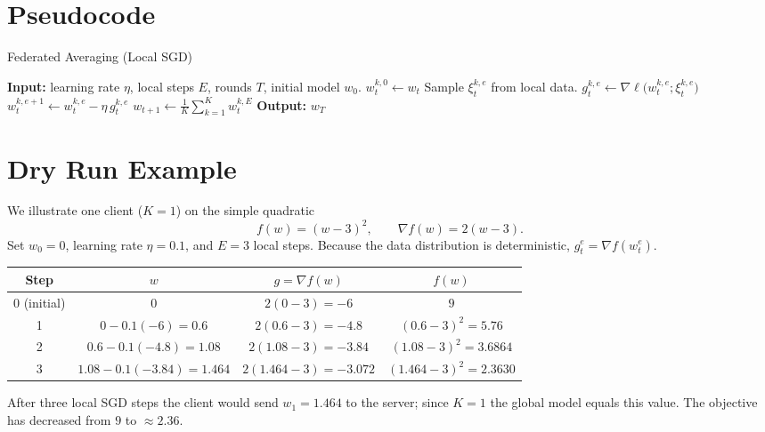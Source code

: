 \documentclass{article}
\newcommand{\grad}{\nabla}
\begin{document}
\section*{Pseudocode}
\begin{algorithm}[H]
\caption{Federated Averaging (Local SGD)}\label{alg:fedavg}
\begin{algorithmic}[1]
\STATE \textbf{Input:} learning rate $\eta$, local steps $E$, rounds $T$, initial model $w_0$.
        \STATE $w_{t}^{k,0}\leftarrow w_t$
            \STATE Sample $\xi_{t}^{k,e}$ from local data.
            \STATE $g_{t}^{k,e}\leftarrow \grad\ell\bigl(w_{t}^{k,e};\xi_{t}^{k,e}\bigr)$
            \STATE $w_{t}^{k,e+1}\leftarrow w_{t}^{k,e}-\eta\,g_{t}^{k,e}$
        \ENDFOR
    \ENDFOR
    \STATE $w_{t+1}\leftarrow \frac1K\sum_{k=1}^{K} w_{t}^{k,E}$   
\ENDFOR
\STATE \textbf{Output:} $w_T$
\end{algorithmic}
\end{algorithm}

\section*{Dry Run Example}
We illustrate one client ($K=1$) on the simple quadratic
\[
f(w)=(w-3)^2,\qquad \grad f(w)=2(w-3).
\]
Set $w_0=0$, learning rate $\eta=0.1$, and $E=3$ local steps.  
Because the data distribution is deterministic, $g_{t}^{e}= \grad f(w_{t}^{e})$.

\begin{center}
\begin{tabular}{c|c|c|c}
\textbf{Step} & $w$ & $g= \grad f(w)$ & $f(w)$\\\midrule
0 (initial) & $0$ & $2(0-3)=-6$ & $9$\\
1 & $0-0.1(-6)=0.6$ & $2(0.6-3)=-4.8$ & $(0.6-3)^2=5.76$\\
2 & $0.6-0.1(-4.8)=1.08$ & $2(1.08-3)=-3.84$ & $(1.08-3)^2=3.6864$\\
3 & $1.08-0.1(-3.84)=1.464$ & $2(1.464-3)=-3.072$ & $(1.464-3)^2=2.3630$\\
\end{tabular}
\end{center}
After three local SGD steps the client would send $w_{1}=1.464$ to the server; since $K=1$ the global model equals this value. The objective has decreased from $9$ to $\approx2.36$.
\end{document}
